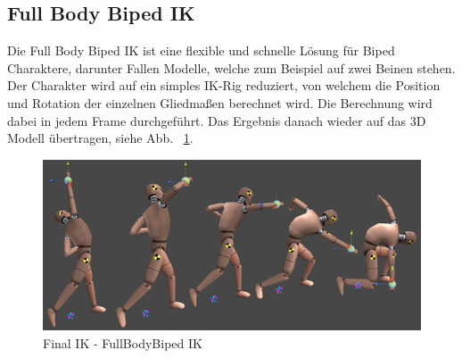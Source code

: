 \subsection{Full Body Biped IK}\label{subsec:full-body-biped-ik}
Die Full Body Biped IK ist eine flexible und schnelle Lösung für Biped Charaktere, darunter Fallen Modelle, welche zum Beispiel auf zwei Beinen stehen.
Der Charakter wird auf ein simples IK-Rig reduziert, von welchem die Position und Rotation der einzelnen Gliedmaßen berechnet wird.
Die Berechnung wird dabei in jedem Frame durchgeführt.
Das Ergebnis danach wieder auf das 3D Modell übertragen, siehe Abb. ~\ref{fig:finalIK_full_body_biped_ik}.
~\cite{FinalIK_FullBodyBipedIK_2021}

\begin {figure}
    \centering
    \includegraphics[scale=0.5]{pics/fullbodybipedIK}
    \caption{Final IK - FullBodyBiped IK}
    \label{fig:finalIK_full_body_biped_ik}
\end {figure}
